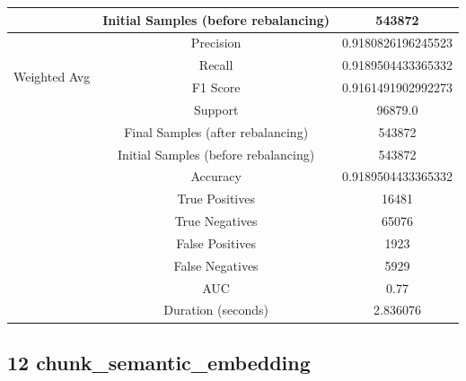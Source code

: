 \begin{longtable}{|c|c|c|}
 & Initial Samples (before rebalancing) & 543872 \\
\hline
\multirow{4}{*}{Weighted Avg} & Precision & 0.9180826196245523 \\
 & Recall & 0.9189504433365332 \\
 & F1 Score & 0.9161491902992273 \\
 & Support & 96879.0 \\
 & Final Samples (after rebalancing) & 543872 \\
 & Initial Samples (before rebalancing) & 543872 \\
\hline
& Accuracy & 0.9189504433365332 \\ \hline
& True Positives & 16481 \\ \hline
& True Negatives & 65076 \\ \hline
& False Positives & 1923 \\ \hline
& False Negatives & 5929 \\ \hline
& AUC & 0.77 \\ \hline
& Duration (seconds) & 2.836076 \\ \hline
\end{longtable}


\subsection{12 chunk\_semantic\_embedding}

